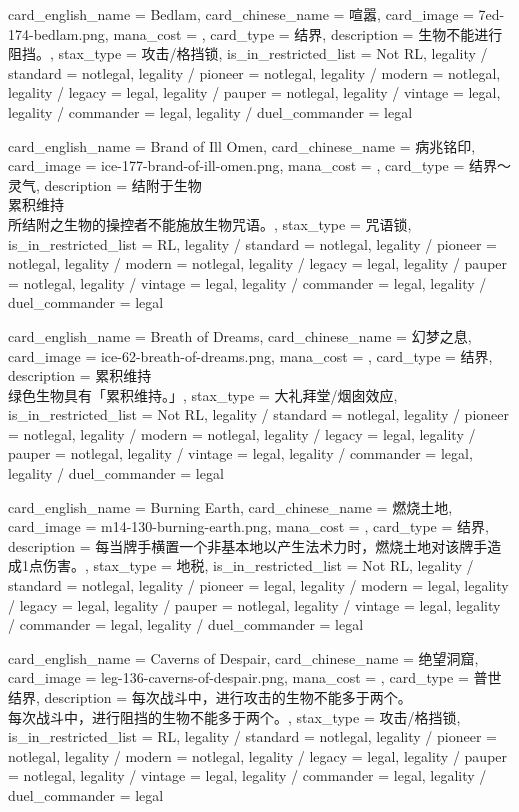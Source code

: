 \documentclass[lang = cn, color = black, 10pt]{AllThatStax}
\begin{document}
\card
{
	card_english_name = {Bedlam},
	card_chinese_name = {喧嚣},
	card_image = 7ed-174-bedlam.png,
	mana_cost = ,
	card_type = 结界,
	description = {生物不能进行阻挡。},
	stax_type = 攻击/格挡锁,
	is_in_restricted_list = Not RL,
	legality / standard = notlegal,
	legality / pioneer = notlegal,
	legality / modern = notlegal,
	legality / legacy = legal,
	legality / pauper = notlegal,
	legality / vintage = legal,
	legality / commander = legal,
	legality / duel_commander = legal
}

\card
{
	card_english_name = {Brand of Ill Omen},
	card_chinese_name = {病兆铭印},
	card_image = ice-177-brand-of-ill-omen.png,
	mana_cost = ,
	card_type = 结界～灵气,
	description = {结附于生物\\
累积维持\\
所结附之生物的操控者不能施放生物咒语。},
	stax_type = 咒语锁,
	is_in_restricted_list = RL,
	legality / standard = notlegal,
	legality / pioneer = notlegal,
	legality / modern = notlegal,
	legality / legacy = legal,
	legality / pauper = notlegal,
	legality / vintage = legal,
	legality / commander = legal,
	legality / duel_commander = legal
}

\card
{
	card_english_name = {Breath of Dreams},
	card_chinese_name = {幻梦之息},
	card_image = ice-62-breath-of-dreams.png,
	mana_cost = ,
	card_type = 结界,
	description = {累积维持\\
绿色生物具有「累积维持。」},
	stax_type = 大礼拜堂/烟囱效应,
	is_in_restricted_list = Not RL,
	legality / standard = notlegal,
	legality / pioneer = notlegal,
	legality / modern = notlegal,
	legality / legacy = legal,
	legality / pauper = notlegal,
	legality / vintage = legal,
	legality / commander = legal,
	legality / duel_commander = legal
}

\card
{
	card_english_name = {Burning Earth},
	card_chinese_name = {燃烧土地},
	card_image = m14-130-burning-earth.png,
	mana_cost = ,
	card_type = 结界,
	description = {每当牌手横置一个非基本地以产生法术力时，燃烧土地对该牌手造成1点伤害。},
	stax_type = 地税,
	is_in_restricted_list = Not RL,
	legality / standard = notlegal,
	legality / pioneer = legal,
	legality / modern = legal,
	legality / legacy = legal,
	legality / pauper = notlegal,
	legality / vintage = legal,
	legality / commander = legal,
	legality / duel_commander = legal
}

\card
{
	card_english_name = {Caverns of Despair},
	card_chinese_name = {绝望洞窟},
	card_image = leg-136-caverns-of-despair.png,
	mana_cost = ,
	card_type = 普世结界,
	description = {每次战斗中，进行攻击的生物不能多于两个。\\
每次战斗中，进行阻挡的生物不能多于两个。},
	stax_type = 攻击/格挡锁,
	is_in_restricted_list = RL,
	legality / standard = notlegal,
	legality / pioneer = notlegal,
	legality / modern = notlegal,
	legality / legacy = legal,
	legality / pauper = notlegal,
	legality / vintage = legal,
	legality / commander = legal,
	legality / duel_commander = legal
}
\end{document}
